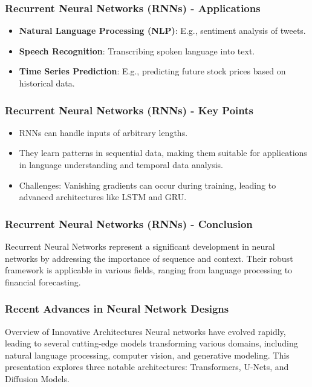 \documentclass[aspectratio=169]{beamer}
\begin{document}
\begin{frame}[fragile]
    \frametitle{Recurrent Neural Networks (RNNs) - Applications}
    \begin{itemize}
        \item \textbf{Natural Language Processing (NLP)}: E.g., sentiment analysis of tweets.
        \item \textbf{Speech Recognition}: Transcribing spoken language into text.
        \item \textbf{Time Series Prediction}: E.g., predicting future stock prices based on historical data.
    \end{itemize}
\end{frame}

\begin{frame}[fragile]
    \frametitle{Recurrent Neural Networks (RNNs) - Key Points}
    \begin{itemize}
        \item RNNs can handle inputs of arbitrary lengths.
        \item They learn patterns in sequential data, making them suitable for applications in language understanding and temporal data analysis.
        \item Challenges: Vanishing gradients can occur during training, leading to advanced architectures like LSTM and GRU.
    \end{itemize}
\end{frame}

\begin{frame}[fragile]
    \frametitle{Recurrent Neural Networks (RNNs) - Conclusion}
    Recurrent Neural Networks represent a significant development in neural networks by addressing the importance of sequence and context. Their robust framework is applicable in various fields, ranging from language processing to financial forecasting.
\end{frame}

\begin{frame}[fragile]
    \frametitle{Recent Advances in Neural Network Designs}
    \begin{block}{Overview of Innovative Architectures}
        Neural networks have evolved rapidly, leading to several cutting-edge models transforming various domains, including natural language processing, computer vision, and generative modeling. This presentation explores three notable architectures: Transformers, U-Nets, and Diffusion Models.
    \end{block}
\end{frame}
\end{document}
